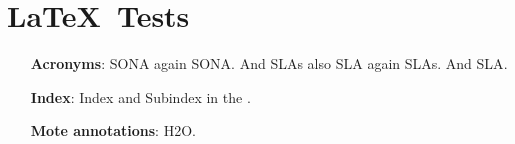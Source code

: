 
\cleardoublepage\chapter{\LaTeX~Tests}\minitoc\label{sec:latextest}\vspace{.5cm}
\cite{kelly2007}
\noindent\lipsum[7]

\begin{itemize}
  \item[\textbf{Acronyms}:] \ac{SONA} again \ac{SONA}. And \acp{SLA} also \ac{SLA} again \acp{SLA}. And \acf{SLA}.
  \item[\textbf{Index}:] Index and Subindex in the \appendixname.
  \item[\textbf{Mote annotations}:] \ac{H2O}.
\end{itemize}


